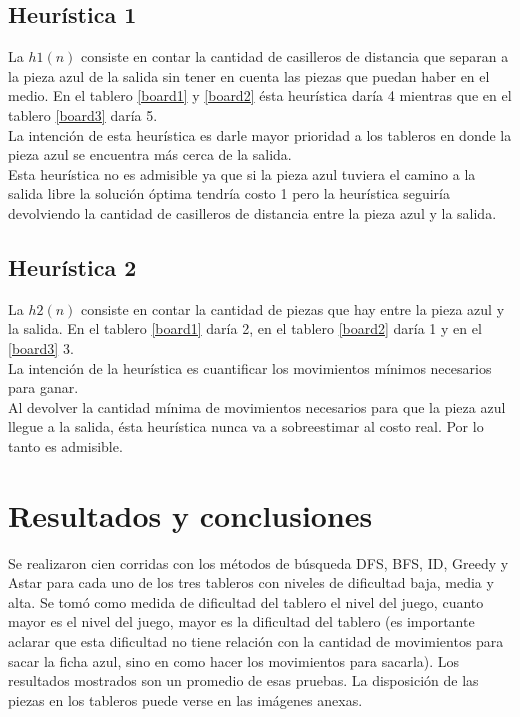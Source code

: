 \documentclass[10pt,journal,compsoc]{IEEEtran}
\begin{document}
\subsection{Heur\'istica 1}
La $h1(n)$ consiste en contar la cantidad de casilleros de distancia que separan a la pieza azul de la salida sin tener en cuenta las piezas que puedan haber en el medio. En el tablero \ref{board1} y \ref{board2} \'esta heur\'istica dar\'ia 4 mientras que en el tablero \ref{board3} dar\'ia 5.\\
 La intenci\'on de esta heur\'istica es darle mayor prioridad a los tableros en donde la pieza azul se encuentra m\'as cerca de la salida.\\
 Esta heur\'istica no es admisible ya que si la pieza azul tuviera el camino a la salida libre la soluci\'on \'optima tendr\'ia costo 1 pero la heur\'istica seguir\'ia devolviendo la cantidad de casilleros de distancia entre la pieza azul y la salida.

\subsection{Heur\'istica 2}
La $h2(n)$ consiste en contar la cantidad de piezas que hay entre la pieza azul y la salida. En el tablero \ref{board1} dar\'ia 2, en el tablero \ref{board2} dar\'ia 1 y en el \ref{board3} 3.\\
La intenci\'on de la heur\'istica es cuantificar los movimientos m\'inimos necesarios para ganar.\\
Al devolver la cantidad m\'inima de movimientos necesarios para que la pieza azul llegue a la salida, \'esta heur\'istica nunca va a sobreestimar al costo real. Por lo tanto es admisible.

\section{Resultados y conclusiones}

Se realizaron cien corridas con los m\'etodos de b\'usqueda DFS, BFS, ID, Greedy y Astar para cada uno de los tres tableros con niveles de dificultad baja, media y alta. Se tom\'o como medida de dificultad del tablero el nivel del juego, cuanto mayor es el nivel del juego, mayor es la dificultad del tablero (es importante aclarar que esta dificultad no tiene relaci\'on con la cantidad de movimientos para sacar la ficha azul, sino en como hacer los movimientos para sacarla). Los resultados mostrados son un promedio de esas pruebas. La disposici\'on de las piezas en los tableros puede verse en las im\'agenes anexas.
\end{document}
